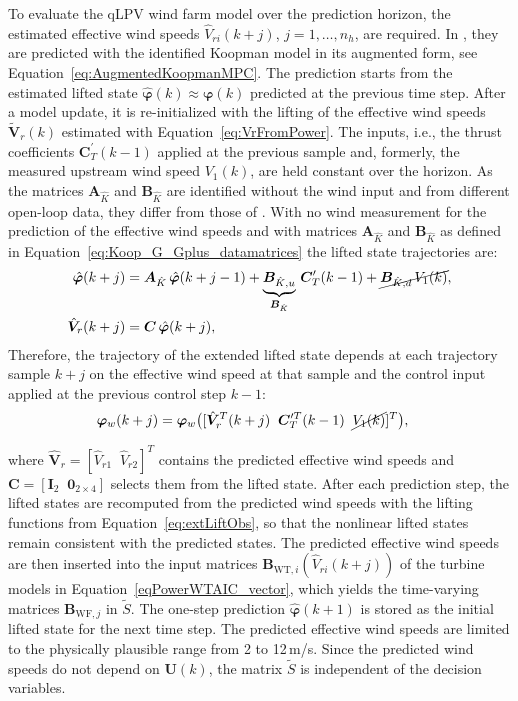 To evaluate the qLPV wind farm model over the prediction horizon, the estimated effective wind speeds $\hat{V}_{ri}(k+j)$, $j = 1, \dots, n_h$, are required. In \cite{dittmer2022data}, they are predicted with the identified Koopman model in its augmented form, see Equation~\eqref{eq:AugmentedKoopmanMPC}. 
The prediction starts from the estimated lifted state $\hat{\bm{\varphi}}(k)\approx \bm{\varphi}(k)$ predicted at the previous time step. After a model update, it is re-initialized with the lifting of the effective wind speeds $\tilde{\bm{V}}_r(k)$ estimated with Equation~\eqref{eq:VrFromPower}. The inputs, i.e., the thrust coefficients $\bm{C}_T^\prime(k-1)$ applied at the previous sample and, formerly, the measured upstream wind speed $V_1(k)$, are held constant over the horizon. As the matrices $\bm{A}_{\hat{K}}$ and $\bm{B}_{\hat{K}}$ are identified without the wind input and from different open-loop data, they differ from those of \cite{dittmer2022data}. With no wind measurement for the prediction of the effective wind speeds and with matrices $\bm{A}_{\hat{K}}$ and $\bm{B}_{\hat{K}}$ as defined in Equation~\eqref{eq:Koop_G_Gplus_datamatrices} the lifted state trajectories are:
\begin{align*}
    \hat{\bm{\varphi}}(k+j) &= \bm{A}_{\hat{K}}\, \hat{\bm{\varphi}}(k+j-1) + \underbrace{\bm{B}_{\hat{K},u}}_{\bm{B}_{\hat{K}}}\, \bm{C}_T^\prime(k-1) + \cancel{\bm{B}_{\hat{K},d}\, V_1(k)}, \\
    \hat{\bm{V}}_r(k+j) &= \bm{C}\, \hat{\bm{\varphi}}(k+j),\end{align*}
Therefore, the trajectory of the extended lifted state depends at each trajectory sample $k+j$ on the effective wind speed at that sample and the control input applied at the previous control step $k-1$:
\begin{align*}    
    \bm{\varphi}_w(k+j) &= \bm{\varphi}_w\big([\hat{\bm{V}}_r^T(k+j) \;\; \bm{C}_T^{\prime T}(k-1) \;\; \cancel{V_1(k)}]^T\big),
\end{align*}

where $\hat{\bm{V}}_r = [\hat{V}_{r1} \;\; \hat{V}_{r2}]^T$ contains the predicted effective wind speeds and $\bm{C} = [\bm{I}_{2} \;\; \bm{0}_{2 \times 4}]$ selects them from the lifted state. After each prediction step, the lifted states are recomputed from the predicted wind speeds with the lifting functions from Equation~\eqref{eq:extLiftObs}, so that the nonlinear lifted states remain consistent with the predicted states. The predicted effective wind speeds are then inserted into the input matrices $\bm{B}_{\text{WT},i}(\hat{V}_{ri}(k+j))$ of the turbine models in Equation~\eqref{eqPowerWTAIC_vector}, which yields the time-varying matrices $\bm{B}_{\text{WF},j}$ in $\tilde{S}$. The one-step prediction $\hat{\bm{\varphi}}(k+1)$ is stored as the initial lifted state for the next time step. The predicted effective wind speeds are limited to the physically plausible range from 2 to 12\,m/s. Since the predicted wind speeds do not depend on $\bm{U}(k)$, the matrix $\tilde{S}$ is independent of the decision variables.

